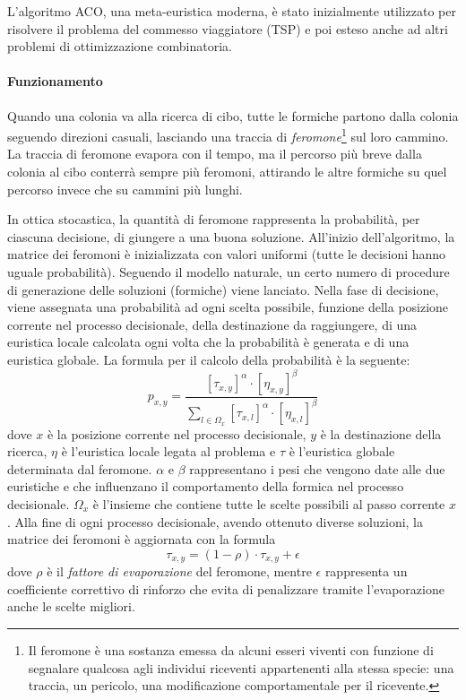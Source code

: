 L'algoritmo \ac{ACO}, una meta-euristica moderna, è stato inizialmente 
utilizzato per risolvere il problema del commesso viaggiatore (\acs{TSP}) 
\cite{AntSystem} e poi esteso anche ad altri problemi di ottimizzazione 
combinatoria.

\paragraph{Funzionamento}
Quando una colonia va alla ricerca di cibo, tutte le formiche partono dalla 
colonia seguendo direzioni casuali, lasciando una traccia di 
\emph{feromone}\footnote{Il feromone è una sostanza emessa da alcuni esseri 
viventi con funzione di segnalare qualcosa agli individui riceventi 
appartenenti alla stessa specie: una traccia, un pericolo, una modificazione 
comportamentale per il ricevente.} sul loro cammino. La traccia di feromone 
evapora con il tempo, ma il percorso più breve dalla colonia al cibo conterrà 
sempre più feromoni, attirando le altre formiche su quel percorso invece che su 
cammini più lunghi.

In ottica stocastica, la quantità di feromone rappresenta la probabilità, per 
ciascuna decisione, di giungere a una buona soluzione. All'inizio 
dell'algoritmo, la matrice dei feromoni è inizializzata con valori uniformi 
(tutte le decisioni hanno uguale probabilità). Seguendo il modello naturale, un 
certo numero di procedure di generazione delle soluzioni (formiche) viene 
lanciato. Nella fase di decisione, viene assegnata una probabilità ad ogni 
scelta possibile, funzione della posizione corrente nel processo decisionale, 
della destinazione da raggiungere, di una euristica locale calcolata ogni volta 
che la probabilità è generata e di una euristica globale. La formula per il 
calcolo della probabilità è la seguente:
\begin{equation}
 p_{x,y} = \frac{[\tau_{x,y}]^{\alpha}\cdot[\eta_{x,y}]^{\beta}}{\sum_{l \in 
\Omega_{x}}[\tau_{x,l}]^{\alpha}\cdot[\eta_{x,l}]^{\beta}}
\end{equation}
dove $x$ è la posizione corrente nel processo decisionale, $y$ è la 
destinazione della ricerca, $\eta$ è l'euristica locale legata al problema e 
$\tau$ è l'euristica globale determinata dal feromone. $\alpha$ e $\beta$ 
rappresentano i pesi che vengono date alle due euristiche e che influenzano il 
comportamento della formica nel processo decisionale. $\Omega_x$ è l'insieme che 
contiene tutte le scelte possibili al passo corrente $x$. Alla fine di ogni 
processo decisionale, avendo ottenuto diverse soluzioni, la matrice dei 
feromoni è aggiornata con la formula
\begin{equation}
 \tau_{x,y} = (1-\rho)\cdot \tau_{x,y} + \epsilon
\end{equation}
dove $\rho$ è il \emph{fattore di evaporazione} del feromone, mentre $\epsilon$ 
rappresenta un coefficiente correttivo di rinforzo che evita di penalizzare 
tramite l'evaporazione anche le scelte migliori.


